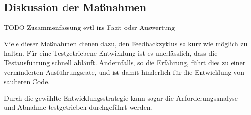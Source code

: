 \subsection{Diskussion der Maßnahmen}
TODO Zusammenfassung evtl ins Fazit oder Auswertung

Viele dieser Maßnahmen dienen dazu, den Feedbackzyklus so kurz wie möglich zu halten. Für eine Testgetriebene Entwicklung ist es unerlässlich, dass die Testausführung schnell abläuft. Andernfalls, so die Erfahrung, führt dies zu einer verminderten Ausführungsrate, und ist damit hinderlich für die Entwicklung von sauberen Code.

Durch die gewählte Entwicklungsstrategie kann sogar die Anforderungsanalyse und Abnahme testgetrieben durchgeführt werden. 